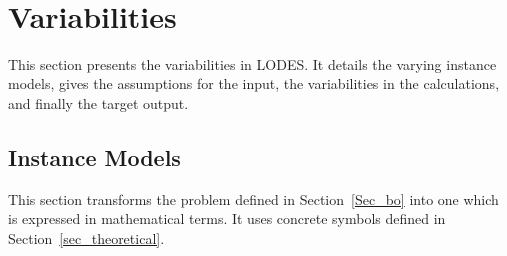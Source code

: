 \documentclass[12pt]{article}
\newcommand{\progname}{LODES} %
\begin{document}
~\newline

\section{Variabilities}

This section presents the variabilities in \progname{}. It details the varying instance models,
gives the assumptions for the input, the variabilities in the calculations, and
finally the target output.

\subsection{Instance Models} \label{sec_instance}    

This section transforms the problem defined in Section~\ref{Sec_bo} into 
one which is expressed in mathematical terms. It uses concrete symbols defined 
in Section~\ref{sec_theoretical}.

~\newline

\end{document}
